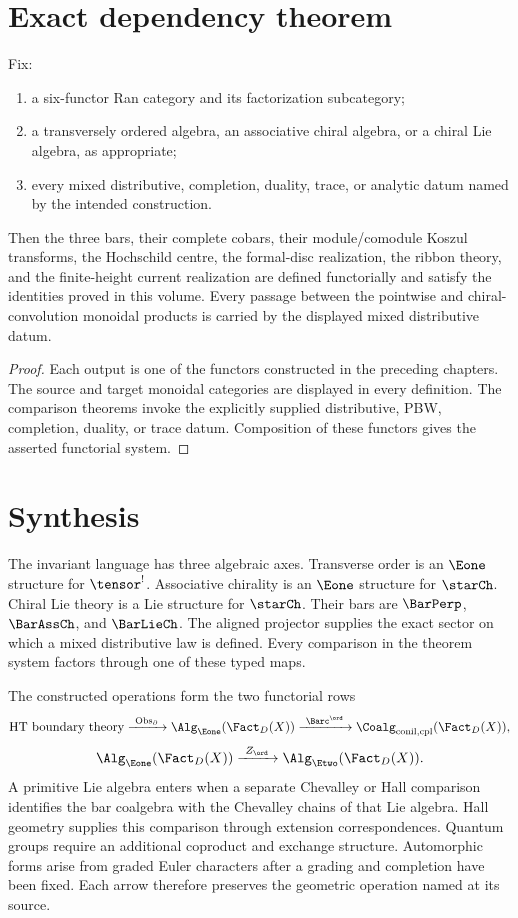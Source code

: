 \chapter{Exact dependency theorem}
\begin{theorem}
Fix:
\begin{enumerate}
\item a six-functor Ran category and its factorization subcategory;
\item a transversely ordered algebra, an associative chiral algebra, or a chiral Lie algebra, as appropriate;
\item every mixed distributive, completion, duality, trace, or analytic datum named by the intended construction.
\end{enumerate}
Then the three bars, their complete cobars, their module/comodule Koszul transforms, the Hochschild centre, the formal-disc realization, the ribbon theory, and the finite-height current realization are defined functorially and satisfy the identities proved in this volume.  Every passage between the pointwise and chiral-convolution monoidal products is carried by the displayed mixed distributive datum.
\end{theorem}
\begin{proof}
Each output is one of the functors constructed in the preceding chapters.  The source and target monoidal categories are displayed in every definition.  The comparison theorems invoke the explicitly supplied distributive, PBW, completion, duality, or trace datum.  Composition of these functors gives the asserted functorial system.
\end{proof}

\chapter{Synthesis}
The invariant language has three algebraic axes.  Transverse order is an $\Eone$ structure for $\tensor^!$.  Associative chirality is an $\Eone$ structure for $\starCh$.  Chiral Lie theory is a Lie structure for $\starCh$.  Their bars are $\BarPerp$, $\BarAssCh$, and $\BarLieCh$.  The aligned projector supplies the exact sector on which a mixed distributive law is defined.  Every comparison in the theorem system factors through one of these typed maps.

The constructed operations form the two functorial rows
\[
 \text{HT boundary theory}
 \xrightarrow{\ \mathrm{Obs}_{\partial}\ }
 \Alg_{\Eone}(\Fact_D(X))
 \xrightarrow{\ \Barc^{\ord}\ }
 \Coalg_{\mathrm{conil,cpl}}(\Fact_D(X)),
\]
\[
 \Alg_{\Eone}(\Fact_D(X))
 \xrightarrow{\ Z_{\ord}\ }
 \Alg_{\Etwo}(\Fact_D(X)).
\]
A primitive Lie algebra enters when a separate Chevalley or Hall comparison identifies the bar coalgebra with the Chevalley chains of that Lie algebra. Hall geometry supplies this comparison through extension correspondences. Quantum groups require an additional coproduct and exchange structure. Automorphic forms arise from graded Euler characters after a grading and completion have been fixed. Each arrow therefore preserves the geometric operation named at its source.

